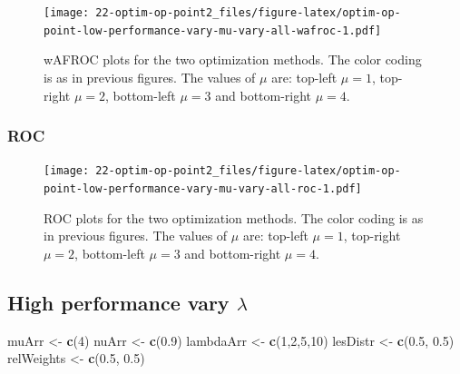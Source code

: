\documentclass[
]{book}
\newenvironment{Shaded}{\begin{snugshade}}{\end{snugshade}}
\newcommand{\DecValTok}[1]{\textcolor[rgb]{0.00,0.00,0.81}{#1}}
\newcommand{\FloatTok}[1]{\textcolor[rgb]{0.00,0.00,0.81}{#1}}
\newcommand{\KeywordTok}[1]{\textcolor[rgb]{0.13,0.29,0.53}{\textbf{#1}}}
\newcommand{\NormalTok}[1]{#1}
\newcommand{\StringTok}[1]{\textcolor[rgb]{0.31,0.60,0.02}{#1}}
\begin{document}
\begin{figure}
\centering
\texttt{[image: 22-optim-op-point2\_files/figure-latex/optim-op-point-low-performance-vary-mu-vary-all-wafroc-1.pdf]}
\caption{\label{fig:optim-op-point-low-performance-vary-mu-vary-all-wafroc}wAFROC plots for the two optimization methods. The color coding is as in previous figures. The values of \(\mu\) are: top-left \(\mu = 1\), top-right \(\mu = 2\), bottom-left \(\mu = 3\) and bottom-right \(\mu = 4\).}
\end{figure}

\hypertarget{roc-6}{%
\subsubsection{ROC}\label{roc-6}}

\begin{figure}
\centering
\texttt{[image: 22-optim-op-point2\_files/figure-latex/optim-op-point-low-performance-vary-mu-vary-all-roc-1.pdf]}
\caption{\label{fig:optim-op-point-low-performance-vary-mu-vary-all-roc}ROC plots for the two optimization methods. The color coding is as in previous figures. The values of \(\mu\) are: top-left \(\mu = 1\), top-right \(\mu = 2\), bottom-left \(\mu = 3\) and bottom-right \(\mu = 4\).}
\end{figure}

\hypertarget{optim-op-point-high-performance-vary-lambda}{%
\subsection{\texorpdfstring{High performance vary \(\lambda\)}{High performance vary \textbackslash lambda}}\label{optim-op-point-high-performance-vary-lambda}}

\begin{Shaded}
\begin{Highlighting}[]
\NormalTok{muArr <-}\StringTok{ }\KeywordTok{c}\NormalTok{(}\DecValTok{4}\NormalTok{)}
\NormalTok{nuArr <-}\StringTok{ }\KeywordTok{c}\NormalTok{(}\FloatTok{0.9}\NormalTok{)}
\NormalTok{lambdaArr <-}\StringTok{ }\KeywordTok{c}\NormalTok{(}\DecValTok{1}\NormalTok{,}\DecValTok{2}\NormalTok{,}\DecValTok{5}\NormalTok{,}\DecValTok{10}\NormalTok{)}
\NormalTok{lesDistr <-}\StringTok{ }\KeywordTok{c}\NormalTok{(}\FloatTok{0.5}\NormalTok{, }\FloatTok{0.5}\NormalTok{)}
\NormalTok{relWeights <-}\StringTok{ }\KeywordTok{c}\NormalTok{(}\FloatTok{0.5}\NormalTok{, }\FloatTok{0.5}\NormalTok{)}
\end{Highlighting}
\end{Shaded}
\end{document}
